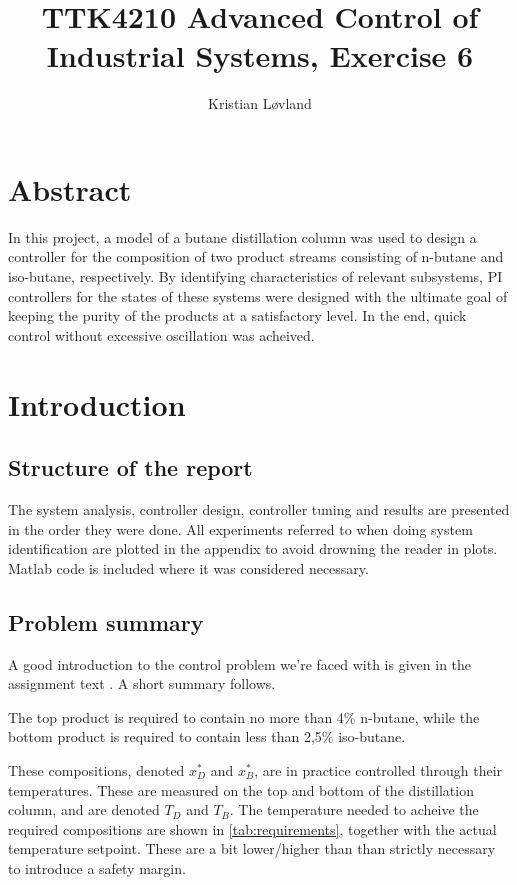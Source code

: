 \documentclass[12pt]{article}
\title{TTK4210 Advanced Control of Industrial Systems, Exercise 6}
\date{}
\author{Kristian Løvland}
\begin{document}
\maketitle
\newpage
\tableofcontents

\newpage
\section{Abstract}
In this project, a model of a butane distillation column was used to design a controller for the composition of two product streams consisting of n-butane and iso-butane, respectively. By identifying characteristics of relevant subsystems, PI controllers for the states of these systems were designed with the ultimate goal of keeping the purity of the products at a satisfactory level. In the end, quick control without excessive oscillation was acheived.

\newpage
\section{Introduction}

\subsection{Structure of the report}
The system analysis, controller design, controller tuning and results are presented in the order they were done. All experiments referred to when doing system identification are plotted in the appendix to avoid drowning the reader in plots. Matlab code is included where it was considered necessary.

\subsection{Problem summary}
A good introduction to the control problem we're faced with is given in the assignment text \cite{oppgavetekst}. A short summary follows.

The top product is required to contain no more than 4\% n-butane, while the bottom product is required to contain less than 2,5\% iso-butane. 

These compositions, denoted $x_D^*$ and $x_B^*$, are in practice controlled through their temperatures. These are measured on the top and bottom of the distillation column, and are denoted $T_D$ and $T_B$. The temperature needed to acheive the required compositions are shown in \ref{tab:requirements}, together with the actual temperature setpoint. These are a bit lower/higher than than strictly necessary to introduce a safety margin.
\end{document}
